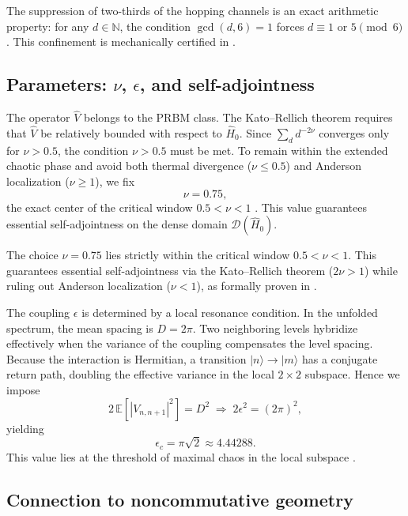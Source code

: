 \documentclass[11pt,a4paper]{article}
\begin{document}
The suppression of two-thirds of the hopping channels is an exact arithmetic property: 
for any $d \in \mathbb{N}$, the condition $\gcd(d, 6) = 1$ forces $d \equiv 1$ or $5 \pmod 6$. 
This confinement is mechanically certified in .

\subsection{Parameters: \texorpdfstring{$\nu$}{nu}, \texorpdfstring{$\epsilon$}{epsilon}, and self-adjointness}

The operator $\hat V$ belongs to the PRBM class. The Kato--Rellich theorem requires that $\hat V$ be relatively bounded with respect to $\hat H_0$. Since $\sum_d d^{-2\nu}$ converges only for $\nu>0.5$, the condition $\nu>0.5$ must be met. To remain within the extended chaotic phase and avoid both thermal divergence ($\nu\le0.5$) and Anderson localization ($\nu\ge1$), we fix
\begin{equation}
\nu = 0.75,
\end{equation}
the exact center of the critical window $0.5<\nu<1$ \cite{Mirlin1996}. This value guarantees essential self-adjointness on the dense domain $\mathcal{D}(\hat H_0)$.

The choice $\nu = 0.75$ lies strictly within the critical window $0.5 < \nu < 1$. 
This guarantees essential self-adjointness via the Kato--Rellich theorem ($2\nu > 1$) 
while ruling out Anderson localization ($\nu < 1$), as formally proven in .

The coupling $\epsilon$ is determined by a local resonance condition. In the unfolded spectrum, the mean spacing is $D=2\pi$. Two neighboring levels hybridize effectively when the variance of the coupling compensates the level spacing. Because the interaction is Hermitian, a transition $|n\rangle\to|m\rangle$ has a conjugate return path, doubling the effective variance in the local $2\times2$ subspace. Hence we impose
\begin{equation}
2\,\mathbb{E}[|V_{n,n+1}|^2] = D^2 \;\Longrightarrow\; 2\epsilon^2 = (2\pi)^2,
\end{equation}
yielding
\begin{equation}
\boxed{\epsilon_c = \pi\sqrt{2} \approx 4.44288}.
\label{eq:epsilon}
\end{equation}
This value lies at the threshold of maximal chaos in the local subspace \cite{Cunden2018,Gross1980}.

\subsection{Connection to noncommutative geometry}
\end{document}

